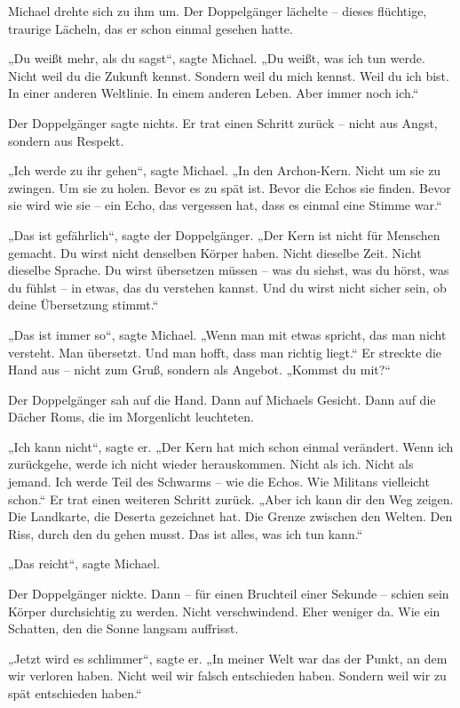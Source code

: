 \documentclass[
]{article}
\begin{document}
Michael drehte sich zu ihm um. Der Doppelgänger lächelte -- dieses flüchtige, traurige Lächeln, das er schon einmal gesehen hatte.

„Du weißt mehr, als du sagst``, sagte Michael. „Du weißt, was ich tun werde. Nicht weil du die Zukunft kennst. Sondern weil du mich kennst. Weil du ich bist. In einer anderen Weltlinie. In einem anderen Leben. Aber immer noch ich.``

Der Doppelgänger sagte nichts. Er trat einen Schritt zurück -- nicht aus Angst, sondern aus Respekt.

„Ich werde zu ihr gehen``, sagte Michael. „In den Archon-Kern. Nicht um sie zu zwingen. Um sie zu holen. Bevor es zu spät ist. Bevor die Echos sie finden. Bevor sie wird wie sie -- ein Echo, das vergessen hat, dass es einmal eine Stimme war.``

„Das ist gefährlich``, sagte der Doppelgänger. „Der Kern ist nicht für Menschen gemacht. Du wirst nicht denselben Körper haben. Nicht dieselbe Zeit. Nicht dieselbe Sprache. Du wirst übersetzen müssen -- was du siehst, was du hörst, was du fühlst -- in etwas, das du verstehen kannst. Und du wirst nicht sicher sein, ob deine Übersetzung stimmt.``

„Das ist immer so``, sagte Michael. „Wenn man mit etwas spricht, das man nicht versteht. Man übersetzt. Und man hofft, dass man richtig liegt.`` Er streckte die Hand aus -- nicht zum Gruß, sondern als Angebot. „Kommst du mit?{\kern0pt}``

Der Doppelgänger sah auf die Hand. Dann auf Michaels Gesicht. Dann auf die Dächer Roms, die im Morgenlicht leuchteten.

„Ich kann nicht``, sagte er. „Der Kern hat mich schon einmal verändert. Wenn ich zurückgehe, werde ich nicht wieder herauskommen. Nicht als ich. Nicht als jemand. Ich werde Teil des Schwarms -- wie die Echos. Wie Militans vielleicht schon.`` Er trat einen weiteren Schritt zurück. „Aber ich kann dir den Weg zeigen. Die Landkarte, die Deserta gezeichnet hat. Die Grenze zwischen den Welten. Den Riss, durch den du gehen musst. Das ist alles, was ich tun kann.``

„Das reicht``, sagte Michael.

Der Doppelgänger nickte. Dann -- für einen Bruchteil einer Sekunde -- schien sein Körper durchsichtig zu werden. Nicht verschwindend. Eher weniger da. Wie ein Schatten, den die Sonne langsam auffrisst.

„Jetzt wird es schlimmer``, sagte er. „In meiner Welt war das der Punkt, an dem wir verloren haben. Nicht weil wir falsch entschieden haben. Sondern weil wir zu spät entschieden haben.``
\end{document}
